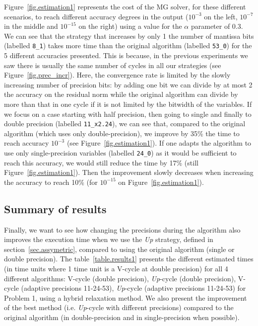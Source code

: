    Figure~\ref{fig.estimation1} represents the cost of the MG solver, for these different scenarios, to reach different accuracy degrees in the output ($10^{-3}$ on the left, $10^{-7}$ in the middle and $10^{-15}$ on the right) using
   a value for the $\alpha$ parameter of 0.3. We can see that the strategy that increases by only 1 the number of mantissa bits (labelled \texttt{8\_1}) takes more time than the original algorithm (labelled \texttt{53\_0}) for the 5 different accuracies presented. This is because, in the previous experiments we saw
   there is usually the same number of cycles in all our strategies (see Figure~\ref{fig.prec_incr}). Here, the convergence rate is limited by the slowly increasing number of precision bits: by adding one bit we can divide by at most 2 the 
   accuracy on the residual norm while the original algorithm can divide by more than that in one cycle if it is not limited by the bitwidth of the variables.
   If we focus on a case starting with half precision, then going to single and finally to double precision (labelled \texttt{11\_x2.24}), we can see that, compared to the original algorithm (which uses only double-precision), we improve by 35\% the time to reach 
   accuracy $10^{-3}$ (see Figure~\ref{fig.estimation1}). If one adapts the algorithm to use only single-precision variables (labelled \texttt{24\_0}) as it would be sufficient to reach this accuracy, we would still reduce the time by 17\% (still Figure~\ref{fig.estimation1}). Then the improvement slowly decreases when increasing the accuracy to reach 10\% (for $10^{-15}$ on Figure~\ref{fig.estimation1}).
   
   \subsection{Summary of results}
   
   Finally, we want to see how changing the precisions during the algorithm also improves the execution time when we use the \emph{Up} strategy, defined in section~\ref{sec.assymetric}, compared to using the original algorithm (single or double precision).
   The table~\ref{table.results1} presents the different estimated times (in time units where 1 time unit is a V-cycle at double precision)
   for all 4 different algorithms: V-cycle (double precision), \emph{Up}-cycle (double precision), V-cycle (adaptive precisions 11-24-53), \emph{Up}-cycle (adaptive precisions 11-24-53) for Problem 1, using a hybrid relaxation method.
   We also present the improvement of the best method (i.e. \emph{Up}-cycle with different precisions) compared to the original algorithm (in double-precision and in single-precision when possible).
  
